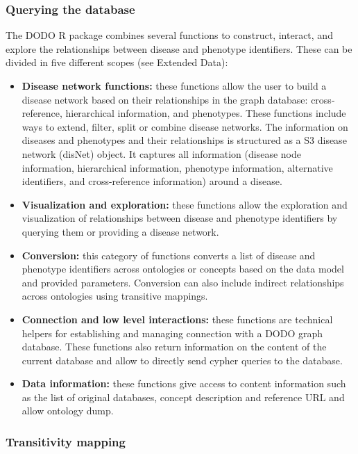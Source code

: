 \documentclass[9pt,a4paper,]{extarticle}
\begin{document}
\hypertarget{querying-the-database}{%
\subsubsection{Querying the database}\label{querying-the-database}}

The DODO R package combines several functions to construct, interact, and explore the relationships between disease and phenotype identifiers. These can be divided in five different scopes (see Extended Data):

\begin{itemize}
\item
  \textbf{Disease network functions:} these functions allow the user to build a disease network based on their relationships in the graph database: cross-reference, hierarchical information, and phenotypes. These functions include ways to extend, filter, split or combine disease networks. The information on diseases and phenotypes and their relationships is structured as a S3 disease network (disNet) object. It captures all information (disease node information, hierarchical information, phenotype information, alternative identifiers, and cross-reference information) around a disease.
\item
  \textbf{Visualization and exploration:} these functions allow the exploration and visualization of relationships between disease and phenotype identifiers by querying them or providing a disease network.
\item
  \textbf{Conversion:} this category of functions converts a list of disease and phenotype identifiers across ontologies or concepts based on the data model and provided parameters. Conversion can also include indirect relationships across ontologies using transitive mappings.
\item
  \textbf{Connection and low level interactions:} these functions are technical helpers for establishing and managing connection with a DODO graph database. These functions also return information on the content of the current database and allow to directly send cypher queries to the database.
\item
  \textbf{Data information:} these functions give access to content information such as the list of original databases, concept description and reference URL and allow ontology dump.
\end{itemize}

\hypertarget{transitivity-mapping}{%
\subsubsection{Transitivity mapping}\label{transitivity-mapping}}
\end{document}
